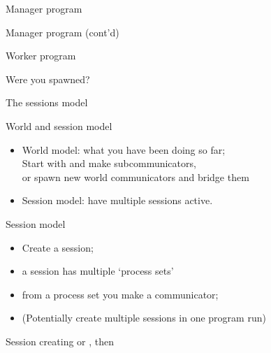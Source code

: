 \begin{numberedframe}{Manager program}
  \footnotesize
\end{numberedframe}

\begin{numberedframe}{Manager program (cont'd)}
  \footnotesize
\end{numberedframe}

\begin{numberedframe}{Worker program}
\end{numberedframe}

\begin{numberedframe}{Were you spawned?}
\end{numberedframe}

 {The sessions model}

\begin{numberedframe}{World and session model}
  \begin{itemize}
  \item World model: what you have been doing so far;\\
    Start with  and
    make subcommunicators, \\
    or spawn new world communicators and bridge them
  \item Session model: have multiple sessions active.
  \end{itemize}
\end{numberedframe}

\begin{numberedframe}{Session model}
  \begin{itemize}
  \item Create a session;
  \item a session has multiple `process sets'
  \item from a process set you make a communicator;
  \item (Potentially create multiple sessions in one program run)
  \end{itemize}
\end{numberedframe}

\begin{numberedframe}{Session creating}
  or , then
\end{numberedframe}

